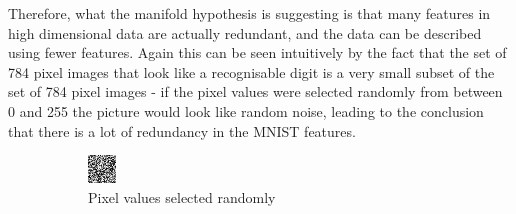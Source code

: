 \documentclass[12pt,a4paper,twoside,openright]{report}
\begin{document}
Therefore, what the manifold hypothesis is suggesting is that many features in high dimensional data are actually redundant,
and the data can be described using fewer features. Again this can be seen intuitively by the fact that the set of 784 pixel images 
that look like a recognisable digit is a very small subset of the set of 784 pixel images - if the pixel values were selected randomly from 
between 0 and 255 the picture would look like random noise, leading to the conclusion that there is a lot of redundancy in the MNIST features.
\begin{figure}[H]
  \centering
  \begin{subfigure}[b]{0.4\linewidth}
    \includegraphics[width=\linewidth,scale=1]{figs/rand_noise.png}
    \caption{Pixel values selected randomly}
  \end{subfigure}
  \begin{subfigure}[b]{0.4\linewidth}

\end{subfigure}
\end{figure}
\end{document}
